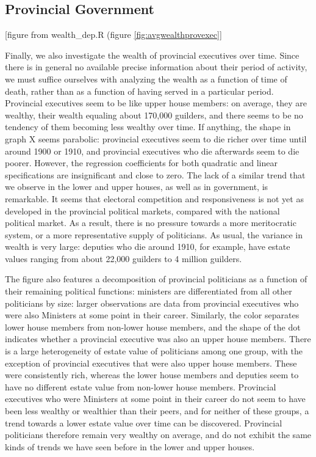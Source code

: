 \subsection{Provincial Government}
\begin{center}    
    [figure from wealth\_dep.R (figure \ref{fig:avgwealthprovexec}]
 \end{center}   
    Finally, we also investigate the wealth of provincial executives over time. Since there is in general no available precise information about their period of activity, we must suffice ourselves with analyzing the wealth as a function of time of death, rather than as a function of having served in a particular period. Provincial executives seem to be like upper house members: on average, they are wealthy, their wealth equaling about 170,000 guilders, and there seems to be no tendency of them becoming less wealthy over time. If anything, the shape in graph X seems parabolic: provincial executives seem to die richer over time until around 1900 or 1910, and provincial executives who die afterwards seem to die poorer. However, the regression coefficients for both quadratic and linear specifications are insignificant and close to zero. The lack of a similar trend that we observe in the lower and upper houses, as well as in government, is remarkable. It seems that electoral competition and responsiveness is not yet as developed in the provincial political markets, compared with the national political market. As a result, there is no pressure towards a more meritocratic system, or a more representative supply of politicians. As usual, the variance in wealth is very large: deputies who die around 1910, for example, have estate values ranging from about 22,000 guilders to 4 million guilders. 
    
    The figure also features a decomposition of provincial politicians as a function of their remaining political functions: ministers are differentiated from all other politicians by size: larger observations are data from provincial executives who were also Ministers at some point in their career. Similarly, the color separates lower house members from non-lower house members, and the shape of the dot indicates whether a provincial executive was also an upper house members. There is a large heterogeneity of estate value of politicians among one group, with the exception of provincial executives that were also upper house members. These were consistently rich, whereas the lower house members and deputies seem to have no different estate value from non-lower house members. Provincial executives who were Ministers at some point in their career do not seem to have been less wealthy or wealthier than their peers, and for neither of these groups, a trend towards a lower estate value over time can be discovered. Provincial politicians therefore remain very wealthy on average, and do not exhibit the same kinds of trends we have seen before in the lower and upper houses. 

